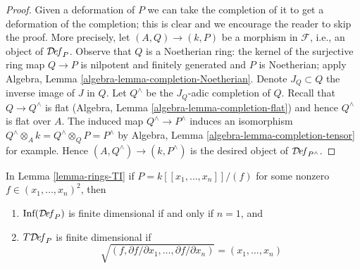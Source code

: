 \begin{proof}
Given a deformation of $P$ we can take the completion
of it to get a deformation of the completion; this is
clear and we encourage the reader to skip the proof. More precisely,
let $(A, Q) \to (k, P)$ be a morphism in $\mathcal{F}$, i.e.,
an object of $\mathcal{D}\!\mathit{ef}_P$. Observe that $Q$ is a Noetherian
ring: the kernel of the surjective ring map $Q \to P$ is
nilpotent and finitely generated and $P$ is Noetherian; apply
Algebra, Lemma \ref{algebra-lemma-completion-Noetherian}.
Denote $J_Q \subset Q$ the inverse
image of $J$ in $Q$. Let $Q^\wedge$ be the $J_Q$-adic completion of $Q$.
Recall that $Q \to Q^\wedge$ is flat
(Algebra, Lemma \ref{algebra-lemma-completion-flat})
and hence $Q^\wedge$ is flat over $A$.
The induced map $Q^\wedge \to P^\wedge$ induces an isomorphism
$Q^\wedge \otimes_A k = Q^\wedge \otimes_Q P = P^\wedge$ by
Algebra, Lemma \ref{algebra-lemma-completion-tensor} for example.
Hence $(A, Q^\wedge) \to (k, P^\wedge)$
is the desired object of $\mathcal{D}\!\mathit{ef}_{P^\wedge}$.
\end{proof}

\begin{lemma}
\label{lemma-power-series-rings-TI}
In Lemma \ref{lemma-rings-TI} if $P = k[[x_1, \ldots, x_n]]/(f)$
for some nonzero $f \in (x_1, \ldots, x_n)^2$, then
\begin{enumerate}
\item $\text{Inf}(\mathcal{D}\!\mathit{ef}_P)$ is finite dimensional
if and only if $n = 1$, and
\item $T\mathcal{D}\!\mathit{ef}_P$ is finite dimensional if
$$
\sqrt{(f, \partial f/\partial x_1, \ldots,  \partial f/\partial x_n)} =
(x_1, \ldots, x_n)
$$
\end{enumerate}
\end{lemma}

